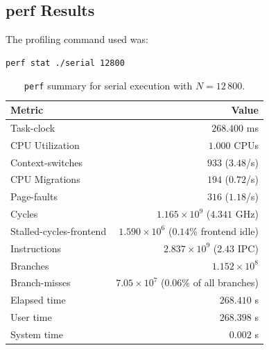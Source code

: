 \documentclass{article}
\begin{document}
\subsection{perf Results}
\label{appendix:perf_results}
The profiling command used was:
\begin{verbatim}
perf stat ./serial 12800
\end{verbatim}
\begin{table}[H]
\centering
\label{tab:perf_summary}
\begin{tabular}{l r}
\toprule
\textbf{Metric} & \textbf{Value} \\
\midrule
Task-clock & $268.400$ ms \\
CPU Utilization & $1.000$ CPUs \\
Context-switches & $933$ ($3.48$/s) \\
CPU Migrations & $194$ ($0.72$/s) \\
Page-faults & $316$ ($1.18$/s) \\
Cycles & $1.165 \times 10^{9}$ ($4.341$ GHz) \\
Stalled-cycles-frontend & $1.590 \times 10^{6}$ ($0.14\%$ frontend idle) \\
Instructions & $2.837 \times 10^{9}$ ($2.43$ IPC) \\
Branches & $1.152 \times 10^{8}$ \\
Branch-misses & $7.05 \times 10^{7}$ ($0.06\%$ of all branches) \\
Elapsed time & $268.410$ s \\
User time & $268.398$ s \\
System time & $0.002$ s \\
\bottomrule
\end{tabular}
\caption{\texttt{perf} summary for serial execution with $N = 12\,800$.}
\end{table}



 
\end{document}
